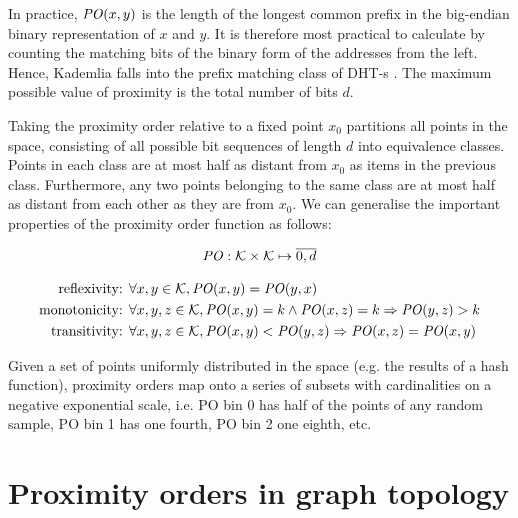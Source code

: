 In practice, $\mathit{PO}(x,y)$ is the length of the longest common prefix in the big-endian binary representation of $x$ and $y$. It is therefore most practical to calculate by counting the matching bits of the binary form of the addresses from the left. Hence, Kademlia falls into the prefix matching class of DHT-s \cite{rowstron2001pastry,zhao2004tapestry}. The maximum possible value of proximity is the total number of bits $d$. 

Taking the proximity order relative to a fixed point $x_0$ partitions all points in
the space, consisting of all possible bit sequences of length $d$ into equivalence classes. Points in each class are at
most half as distant from $x_0$ as items in the previous class. Furthermore, any two points belonging to the same class are at most half as distant from each other as they are from $x_0$. 
We can generalise the important properties of the proximity order function as follows:

\begin{definition}\label{def:PO}
\begin{equation}
\mathit{PO}: \mathcal{K}\times \mathcal{K}\mapsto \overline{0,d}
\end{equation}

\begin{subequations}
  \begin{align}
    \label{eq:PO-constraint-symmetry} \text{reflexivity:  }&\forall x,y\in \mathcal{K}, \mathit{PO}(x,y)=\mathit{PO}(y,x)\\
    \label{eq:PO-constraint-monotonicity}\text{monotonicity:   }&\forall x,y,z\in \mathcal{K}, \mathit{PO}(x,y)=k \land  \mathit{PO}(x,z)=k \Rightarrow  \mathit{PO}(y,z)>k\\
\label{eq:PO-constraint-transitivity}\text{transitivity:   }&\forall x,y,z\in \mathcal{K}, \mathit{PO}(x,y)<\mathit{PO}(y,z) \Rightarrow \mathit{PO}(x,z)=\mathit{PO}(x,y)
   \end{align}
\end{subequations}
\end{definition}

Given a set of points uniformly distributed in the space (e.g. the results of a hash function), proximity orders map onto a series of subsets with cardinalities on a negative exponential scale, i.e. PO bin $0$ has half of the points of any random sample, PO bin 1 has one fourth, PO bin 2 one eighth, etc.

\section{Proximity orders in graph topology \statusgreen}

